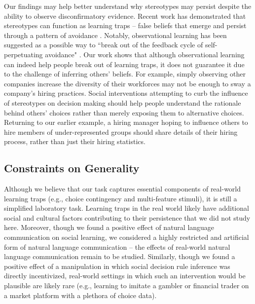 \documentclass[11pt]{article} %
\begin{document}
Our findings may help better understand why stereotypes may persist despite the ability to observe disconfirmatory evidence. Recent work has demonstrated that stereotypes can function as learning traps -- false beliefs that emerge and persist through a pattern of avoidance \cite{allidinaAvoidanceBegetsAvoidance2021, baiCostlyExplorationProduces2025}. Notably, observational learning has been suggested as a possible way to ``break out of the feedback cycle of self-perpetuating avoidance" \cite{allidinaAvoidanceBegetsAvoidance2021}. Our work shows that although observational learning can indeed help people break out of learning traps, it does not guarantee it due to the challenge of inferring others' beliefs. For example, simply observing other companies increase the diversity of their workforces may not be enough to sway a company's hiring practices. Social interventions attempting to curb the influence of stereotypes on decision making should help people understand the rationale behind others' choices rather than merely exposing them to alternative choices. Returning to our earlier example, a hiring manager hoping to influence others to hire members of under-represented groups should share details of their hiring process, rather than just their hiring statistics.

\subsection{Constraints on Generality}
Although we believe that our task captures essential components of real-world learning traps (e.g., choice contingency and multi-feature stimuli), it is still a simplified laboratory task. Learning traps in the real world likely have additional social and cultural factors contributing to their persistence that we did not study here. Moreover, though we found a positive effect of natural language communication on social learning, we considered a highly restricted and artificial form of natural language communication -- the effects of real-world natural language communication remain to be studied. Similarly, though we found a positive effect of a manipulation in which social decision rule inference was directly incentivized, real-world settings in which such an intervention would be plausible are likely rare (e.g., learning to imitate a gambler or financial trader on a market platform with a plethora of choice data). 
\end{document}
